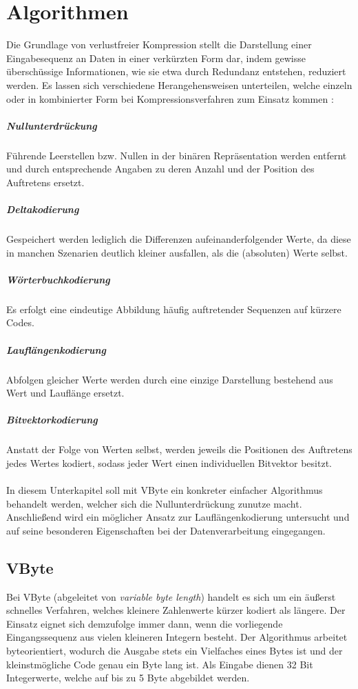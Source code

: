 \section{Algorithmen}

Die Grundlage von verlustfreier Kompression stellt die Darstellung einer Eingabesequenz an Daten in einer verkürzten Form dar, indem gewisse überschüssige Informationen, wie sie etwa durch Redundanz entstehen, reduziert werden. Es lassen sich verschiedene Herangehensweisen unterteilen, welche einzeln oder in kombinierter Form bei Kompressionsverfahren zum Einsatz kommen \cite{Abadi2006}\cite{Croft2009}:

\subparagraph{Nullunterdrückung}
Führende Leerstellen bzw. Nullen in der binären Repräsentation werden entfernt und durch entsprechende Angaben zu deren Anzahl und der Position des Auftretens ersetzt.

\subparagraph{Deltakodierung}
Gespeichert werden lediglich die Differenzen aufeinanderfolgender Werte, da diese in manchen Szenarien deutlich kleiner ausfallen, als die (absoluten) Werte selbst.

\subparagraph{Wörterbuchkodierung}
Es erfolgt eine eindeutige Abbildung häufig auftretender Sequenzen auf kürzere Codes.

\subparagraph{Lauflängenkodierung}
Abfolgen gleicher Werte werden durch eine einzige Darstellung bestehend aus Wert und Lauflänge ersetzt.

\subparagraph{Bitvektorkodierung}
Anstatt der Folge von Werten selbst, werden jeweils die Positionen des Auftretens jedes Wertes kodiert, sodass jeder Wert einen individuellen Bitvektor besitzt.

\paragraph{}
In diesem Unterkapitel soll mit VByte ein konkreter einfacher Algorithmus behandelt werden, welcher sich die Nullunterdrückung zunutze macht. Anschließend wird ein möglicher Ansatz zur Lauflängenkodierung untersucht und auf seine besonderen Eigenschaften bei der Datenverarbeitung eingegangen.

\subsection{VByte}

Bei VByte \cite{Croft2009} (abgeleitet von \textit{variable byte length}) handelt es sich um ein äußerst schnelles Verfahren, welches kleinere Zahlenwerte kürzer kodiert als längere. Der Einsatz eignet sich demzufolge immer dann, wenn die vorliegende Eingangssequenz aus vielen kleineren Integern besteht. Der Algorithmus arbeitet byteorientiert, wodurch die Ausgabe stets ein Vielfaches eines Bytes ist und der kleinstmögliche Code genau ein Byte lang ist. Als Eingabe dienen 32 Bit Integerwerte, welche auf bis zu 5 Byte abgebildet werden.


